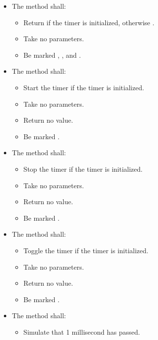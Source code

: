 \begin{parts}
\begin{itemize}
\begin{itemize}
      \item Return  if the timer is running, otherwise .
      \item Take no parameters.
      \item Be marked , , and \code{[[nodiscard]]}.
    \end{itemize}
    \item The method  shall:
    \begin{itemize}
      \item Return  if the timer is initialized, otherwise .
      \item Take no parameters.
      \item Be marked , , and \code{[[nodiscard]]}.
    \end{itemize}
    \item The method  shall:
    \begin{itemize}
      \item Start the timer if the timer is initialized.
      \item Take no parameters.
      \item Return no value.
      \item Be marked .
    \end{itemize}
    \item The method  shall:
    \begin{itemize}
      \item Stop the timer if the timer is initialized.
      \item Take no parameters.
      \item Return no value.
      \item Be marked .
    \end{itemize}
    \item The method  shall:
    \begin{itemize}
      \item Toggle the timer if the timer is initialized.
      \item Take no parameters.
      \item Return no value.
      \item Be marked .
    \end{itemize}
    \item The method  shall:
    \begin{itemize}
      \item Simulate that 1 millisecond has passed.

\end{itemize}
\end{itemize}
\end{parts}
